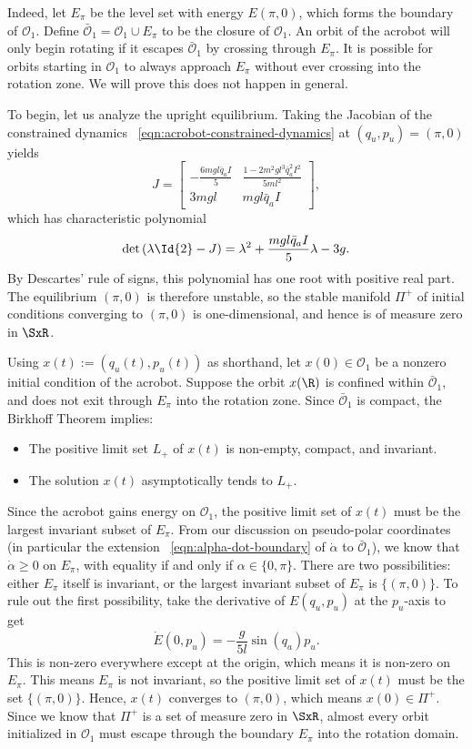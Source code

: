 Indeed, let \(E_\pi\) be the level set with energy \(E(\pi,0)\), 
which forms the boundary of \(\mathcal{O}_1\). 
Define \(\bar{\mathcal{O}}_1 = \mathcal{O}_1 \cup E_\pi\) to be the closure of
\(\mathcal{O}_1\).
An orbit of the acrobot will only begin rotating if it escapes 
\(\bar{\mathcal{O}}_1\) by crossing through \(E_\pi\).
It is possible for orbits starting in \(\mathcal{O}_1\) to always approach
\(E_\pi\) without ever crossing into the rotation zone.
We will prove this does not happen in general.

To begin, let us analyze the upright equilibrium.
Taking the Jacobian of the constrained dynamics
~\eqref{eqn:acrobot-constrained-dynamics} at \((q_u,p_u) = (\pi,0)\) yields
\[
    J = \begin{bmatrix}
        -\frac{6mgl\bar{q}_aI}{5} & \frac{1 - 2m^2gl^3\bar{q}_a^2 I^2}{5ml^2} \\
        3mgl & mgl\bar{q}_aI
    \end{bmatrix}
    ,
\]
which has characteristic polynomial
\[
    \det\left(\lambda \Id{2} - J\right)
    = \lambda^2 + \frac{mgl\bar{q}_a I}{5} \lambda - 3g
    .
\]
By Descartes' rule of signs, this polynomial has one root with positive real
part. 
The equilibrium \((\pi,0)\) is therefore unstable, so the stable manifold \(\Pi^+\) of
initial conditions converging to \((\pi,0)\) is one-dimensional, and hence is
of measure zero in \(\SxR\).

Using \(x(t) := (q_u(t),p_u(t))\) as shorthand, let
\(x(0) \in \mathcal{O}_1\) be a nonzero initial condition of the acrobot.
Suppose the orbit \(x(\R)\) is confined within 
\(\bar{\mathcal{O}}_1\), and does not exit through \(E_\pi\) into the rotation
zone.
Since \(\bar{\mathcal{O}}_1\) is compact, the Birkhoff Theorem \cite{birkhoff}
implies:
\begin{itemize}
    \item The positive limit set \(L_+\) of \(x(t)\) is non-empty, compact, and
        invariant.
    \item The solution \(x(t)\) asymptotically tends to \(L_+\).
\end{itemize}
Since the acrobot gains energy on \(\mathcal{O}_1\), the positive limit set of
\(x(t)\) must be the largest invariant subset of \(E_\pi\). 
From our discussion on pseudo-polar coordinates (in particular the extension
~\eqref{eqn:alpha-dot-boundary} of \(\dot{\alpha}\) to \(\bar{\mathcal{O}}_1\)),
we know that \(\dot{\alpha} \geq 0\) on \(E_\pi\), with equality if and only if 
\(\alpha \in \{0,\pi\}\).
There are two possibilities: either \(E_\pi\) itself is invariant, or the
largest invariant subset of \(E_\pi\) is \(\{(\pi,0)\}\).
To rule out the first possibility, take the derivative of \(E(q_u,p_u)\) at the
\(p_u\)-axis to get
\[
    \dot{E}(0,p_u) = -\frac{g}{5l} \sin(q_a)p_u
    .
\]
This is non-zero everywhere except at the origin, which means it is non-zero on
\(E_\pi\). 
This means \(E_\pi\) is not invariant, so the positive limit set of \(x(t)\)
must be the set \(\{(\pi,0)\}\).
Hence, \(x(t)\) converges to \((\pi,0)\), which means \(x(0) \in \Pi^+\).
Since we know that \(\Pi^+\) is a set of measure zero in \(\SxR\), almost every
orbit initialized in \(\mathcal{O}_1\) must escape through the boundary
\(E_\pi\) into the rotation domain.

